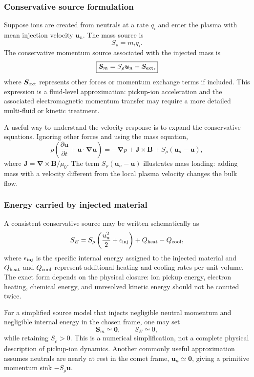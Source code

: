 \documentclass[11pt,a4paper]{article}
\newcommand{\Curl}{\boldsymbol{\nabla}\!\times}
\newcommand{\grad}{\boldsymbol{\nabla}}
\newcommand{\uvec}{\boldsymbol{u}}
\newcommand{\Bvec}{\boldsymbol{B}}
\newcommand{\Jvec}{\boldsymbol{J}}
\newcommand{\Svec}{\boldsymbol{S}}
\newcommand{\rhov}{\rho}
\begin{document}
\subsubsection{Conservative source formulation}
Suppose ions are created from neutrals at a rate $q_i$ and enter the plasma with mean injection velocity $\uvec_n$. The mass source is
\begin{equation}
S_\rho=m_iq_i.
\end{equation}
The conservative momentum source associated with the injected mass is
\begin{equation}
\boxed{\Svec_m=S_\rho\uvec_n+\Svec_{\rm ext},}
\label{eq:momentum-source}
\end{equation}
where $\Svec_{\rm ext}$ represents other forces or momentum exchange terms if included. This expression is a fluid-level approximation: pickup-ion acceleration and the associated electromagnetic momentum transfer may require a more detailed multi-fluid or kinetic treatment.

A useful way to understand the velocity response is to expand the conservative equations. Ignoring other forces and using the mass equation,
\begin{equation}
\rhov\left(\frac{\partial\uvec}{\partial t}+\uvec\cdot\grad\uvec\right)
=-\grad p+\Jvec\times\Bvec+S_\rho(\uvec_n-\uvec),
\label{eq:primitive-momentum}
\end{equation}
where $\Jvec=\Curl\Bvec/\mu_0$. The term $S_\rho(\uvec_n-\uvec)$ illustrates mass loading: adding mass with a velocity different from the local plasma velocity changes the bulk flow.

\subsubsection{Energy carried by injected material}
A consistent conservative source may be written schematically as
\begin{equation}
S_E=S_\rho\left(\frac{u_n^2}{2}+\epsilon_{\rm inj}\right)+Q_{\rm heat}-Q_{\rm cool},
\label{eq:energy-source}
\end{equation}
where $\epsilon_{\rm inj}$ is the specific internal energy assigned to the injected material and $Q_{\rm heat}$ and $Q_{\rm cool}$ represent additional heating and cooling rates per unit volume. The exact form depends on the physical closure: ion pickup energy, electron heating, chemical energy, and unresolved kinetic energy should not be counted twice.

For a simplified source model that injects negligible neutral momentum and negligible internal energy in the chosen frame, one may set
\begin{equation}
\Svec_m\simeq\boldsymbol 0,\qquad S_E\simeq 0,
\end{equation}
while retaining $S_\rho>0$. This is a numerical simplification, not a complete physical description of pickup-ion dynamics. Another commonly useful approximation assumes neutrals are nearly at rest in the comet frame, $\uvec_n\simeq\boldsymbol 0$, giving a primitive momentum sink $-S_\rho\uvec$.
\end{document}
